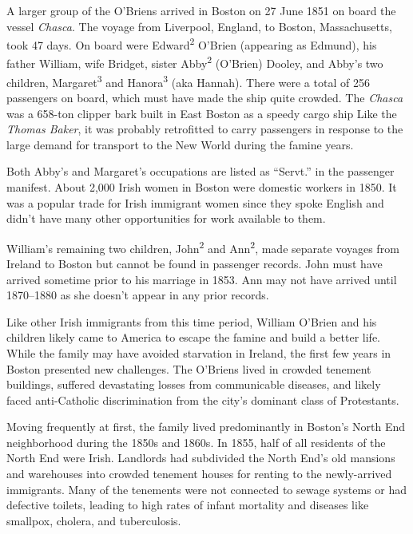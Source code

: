A larger group of the O'Briens arrived in Boston on 27 June 1851 on board the vessel \textit{Chasca}\cite{Chascay}. The voyage from Liverpool, England, to Boston, Massachusetts, took 47 days.\cite{Chascay2} On board were Edward\textsuperscript{2} O'Brien (appearing as Edmund\cite{Edmund}), his father William, wife Bridget, sister Abby\textsuperscript{2} (O'Brien) Dooley, and Abby's two children, Margaret\textsuperscript{3} and Hanora\textsuperscript{3} (aka Hannah). There were a total of 256 passengers on board,\cite{Chascay3} which must have made the ship quite crowded. The \textit{Chasca} was a 658-ton clipper bark built in East Boston as a speedy cargo ship\cite{ChascaCard,Chascay} Like the \textit{Thomas Baker}, it was probably retrofitted to carry passengers in response to the large demand for transport to the New World during the famine years.

Both Abby's and Margaret's occupations are listed as ``Servt.'' in the passenger manifest.\cite{Chascay} About 2,000 Irish women in Boston were domestic workers in 1850. It was a popular trade for Irish immigrant women since they spoke English and didn't have many other opportunities for work available to them.\cite{Ryan:41}

William's remaining two children, John\textsuperscript{2} and Ann\textsuperscript{2}, made separate voyages from Ireland to Boston but cannot be found in passenger records. John must have arrived sometime prior to his marriage in 1853.\cite{John2OBrienCivilMarriage} Ann may not have arrived until 1870--1880 as she doesn't appear in any prior records.\cite{Census1880Edward} 

Like other Irish immigrants from this time period, William O'Brien and his children likely came to America to escape the famine and build a better life. While the family may have avoided starvation in Ireland, the first few years in Boston presented new challenges. The O'Briens lived in crowded tenement buildings, suffered devastating losses from communicable diseases, and likely faced anti-Catholic discrimination from the city's dominant class of Protestants.\cite{Ryan:61,Quinlan:58}
	
Moving frequently at first, the family lived predominantly in Boston's North End neighborhood during the 1850s and 1860s.\cite{NorthEndAddresses} In 1855, half of all residents of the North End were Irish.\cite{Todisco:29} Landlords had subdivided the North End's old mansions and warehouses into crowded tenement houses for renting to the newly-arrived immigrants.\cite{Goldfeld:102} Many of the tenements were not connected to sewage systems or had defective toilets, leading to high rates of infant mortality and diseases like smallpox, cholera, and tuberculosis.\cite{Goldfeld:103,Todisco:21,Ryan:48}


